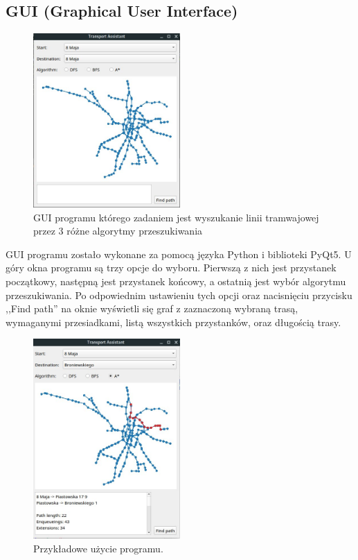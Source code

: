 \documentclass[12pt, polish]{article}
\begin{document}
\subsection{GUI (Graphical User Interface)}
	\begin{figure}[H]
\centering

	\includegraphics[width=0.5\textwidth]{images/gui.jpg}

\caption{GUI programu którego zadaniem jest wyszukanie linii tramwajowej przez 3 różne algorytmy przeszukiwania}
	\end{figure}
GUI programu zostało wykonane za pomocą języka Python i biblioteki PyQt5.
U góry okna programu są trzy opcje do wyboru. Pierwszą z nich jest przystanek początkowy, następną jest przystanek końcowy, a ostatnią jest wybór algorytmu przeszukiwania. Po odpowiednim ustawieniu tych opcji oraz nacisnięciu przycisku ,,Find path'' na oknie wyświetli się graf z zaznaczoną wybraną trasą, wymaganymi przesiadkami, listą wszystkich przystanków, oraz długością trasy.

\begin{figure}[ht]
\centering

	\includegraphics[width=0.5\textwidth]{images/find_example.jpg}

\caption{Przykładowe użycie programu.}
	\end{figure}
\end{document}

